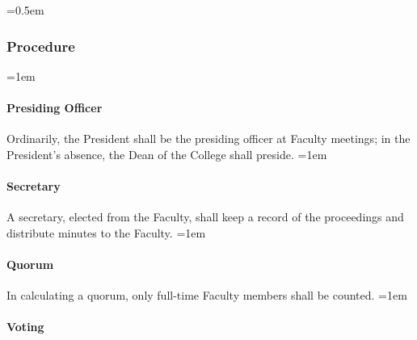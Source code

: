 \documentclass{manual}
\let\oldsubsubsection\subsubsection
\renewcommand\subsubsection{\leftskip=0.5em\oldsubsubsection}
\let\oldparagraph\paragraph
\renewcommand\paragraph{\leftskip=1em\oldparagraph}
\begin{document}
\subsubsection{Procedure} \label{sub:Procedure}
\paragraph{Presiding Officer}
Ordinarily, the President shall be the presiding officer at Faculty meetings; in the President's absence, the Dean of the College shall preside.
\paragraph{Secretary}
A secretary, elected from the Faculty, shall keep a record of the proceedings and distribute minutes to the Faculty.
\paragraph{Quorum}
In calculating a quorum, only full-time Faculty members shall be counted. 
\paragraph{Voting} \label{par:Voting}
\end{document}
